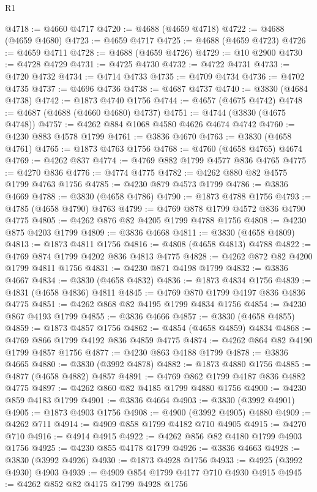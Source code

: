 \begin{lexlean}{R1}
\begin{coremodule}
@4718 := @4660 @4717
@4720 := @4688 (@4659 @4718)
@4722 := @4688 (@4659 @4680)
@4723 := @4659 @4717
@4725 := @4688 (@4659 @4723)
@4726 := @4659 @4711
@4728 := @4688 (@4659 @4726)
@4729 := @10 @2900
@4730 := @4728 @4729
@4731 := @4725 @4730
@4732 := @4722 @4731
@4733 := @4720 @4732
@4734 := @4714 @4733
@4735 := @4709 @4734
@4736 := @4702 @4735
@4737 := @4696 @4736
@4738 := @4687 @4737
@4740 := @3830 (@4684 @4738)
@4742 := @1873 @4740 @1756
@4744 := @4657 (@4675 @4742)
@4748 := @4687 (@4688 (@4660 @4680) @4737)
@4751 := @4744 (@3830 (@4675 @4748))
@4757 := @4262 @884 @1068 @4580 @4626 @4674 @4742
@4760 := @4230 @883 @4578 @1799
@4761 := @3836 @4670
@4763 := @3830 (@4658 @4761)
@4765 := @1873 @4763 @1756
@4768 := @4760 (@4658 @4765) @4674
@4769 := @4262 @837
@4774 := @4769 @882 @1799 @4577 @836 @4765
@4775 := @4270 @836
@4776 := @4774 @4775
@4782 := @4262 @880 @82 @4575 @1799 @4763 @1756
@4785 := @4230 @879 @4573 @1799
@4786 := @3836 @4669
@4788 := @3830 (@4658 @4786)
@4790 := @1873 @4788 @1756
@4793 := @4785 (@4658 @4790) @4763
@4799 := @4769 @878 @1799 @4572 @836 @4790 @4775
@4805 := @4262 @876 @82 @4205 @1799 @4788 @1756
@4808 := @4230 @875 @4203 @1799
@4809 := @3836 @4668
@4811 := @3830 (@4658 @4809)
@4813 := @1873 @4811 @1756
@4816 := @4808 (@4658 @4813) @4788
@4822 := @4769 @874 @1799 @4202 @836 @4813 @4775
@4828 := @4262 @872 @82 @4200 @1799 @4811 @1756
@4831 := @4230 @871 @4198 @1799
@4832 := @3836 @4667
@4834 := @3830 (@4658 @4832)
@4836 := @1873 @4834 @1756
@4839 := @4831 (@4658 @4836) @4811
@4845 := @4769 @870 @1799 @4197 @836 @4836 @4775
@4851 := @4262 @868 @82 @4195 @1799 @4834 @1756
@4854 := @4230 @867 @4193 @1799
@4855 := @3836 @4666
@4857 := @3830 (@4658 @4855)
@4859 := @1873 @4857 @1756
@4862 := @4854 (@4658 @4859) @4834
@4868 := @4769 @866 @1799 @4192 @836 @4859 @4775
@4874 := @4262 @864 @82 @4190 @1799 @4857 @1756
@4877 := @4230 @863 @4188 @1799
@4878 := @3836 @4665
@4880 := @3830 (@3992 @4878)
@4882 := @1873 @4880 @1756
@4885 := @4877 (@4658 @4882) @4857
@4891 := @4769 @862 @1799 @4187 @836 @4882 @4775
@4897 := @4262 @860 @82 @4185 @1799 @4880 @1756
@4900 := @4230 @859 @4183 @1799
@4901 := @3836 @4664
@4903 := @3830 (@3992 @4901)
@4905 := @1873 @4903 @1756
@4908 := @4900 (@3992 @4905) @4880
@4909 := @4262 @711
@4914 := @4909 @858 @1799 @4182 @710 @4905
@4915 := @4270 @710
@4916 := @4914 @4915
@4922 := @4262 @856 @82 @4180 @1799 @4903 @1756
@4925 := @4230 @855 @4178 @1799
@4926 := @3836 @4663
@4928 := @3830 (@3992 @4926)
@4930 := @1873 @4928 @1756
@4933 := @4925 (@3992 @4930) @4903
@4939 := @4909 @854 @1799 @4177 @710 @4930 @4915
@4945 := @4262 @852 @82 @4175 @1799 @4928 @1756

\end{coremodule}
\end{lexlean}

